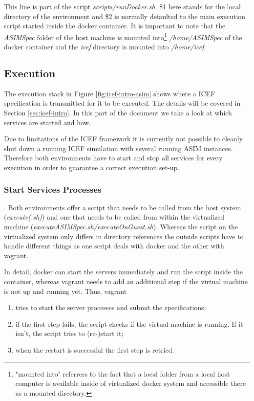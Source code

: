 This line is part of the script \textit{scripts/runDocker.sh}. \$1 here stands for the local directory of the environment and \$2 is normally defaulted to the main execution script started inside the docker container. It is important to note that the \textit{ASIMSpec} folder of the host machine is mounted into\footnote{"mounted into" referrers to the fact that a local folder from a local host computer is available inside of virtualized docker system and accessible there as a mounted directory.} \textit{/home/ASIMSpec} of the docker container and the \textit{icef} directory is mounted into \textit{/home/icef}.

\subsection{Execution}
\label{sec:env-exec-stack-exe}

The execution stack in Figure \ref{fig:icef-intro-asim} shows where a ICEF specification is transmitted for it to be executed. The details will be covered in Section \ref{sec:icef-intro}. In this part of the document we take a look at which services are started and how.

Due to limitations of the ICEF framework it is currently not possible to cleanly shut down a running ICEF simulation with several running ASIM instances. Therefore both environments have to start and stop all services for every execution in order to guarantee a correct execution set-up.

\subsubsection{Start Services Processes}.  Both environments offer a script that needs to be called from the host system (\textit{execute(.sh)}) and one that needs to be called from within the virtualized machine (\textit{executeASIMSpec.sh/executeOnGuest.sh}). Whereas the script on the virtualized system only differs in directory references the outside scripts have to handle different things as one script deals with docker and the other with vagrant.

In detail, docker can start the servers immediately and run the script inside the container, whereas vagrant needs to add an additional step if the virtual machine is not up and running yet. Thus, vagrant
\begin{enumerate}
\vspace{-0.5cm}
	\item tries to start the server processes and submit the specifications;
	\item if the first step fails, the script checks if the virtual machine is running. If it isn't, the script tries to (re-)start it;
	\item when the restart is successful the first step is retried.
\end{enumerate}

